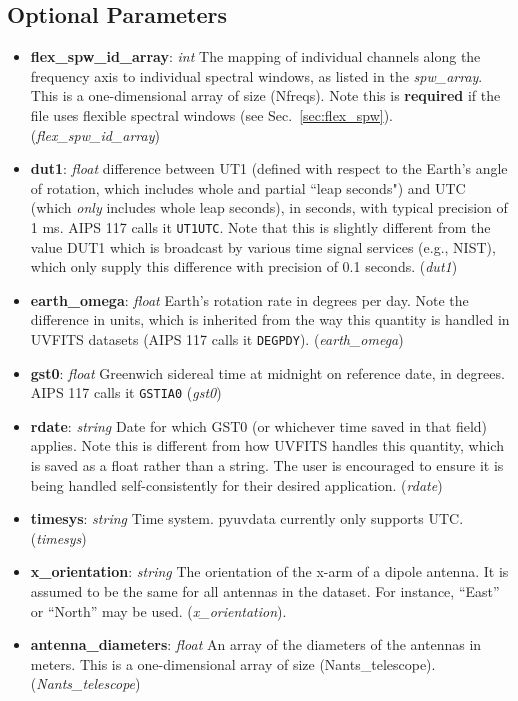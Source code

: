 \documentclass[11pt, oneside]{article}
\begin{document}
\subsection{Optional Parameters}
\label{sec:opt_params}
\begin{itemize}
\item \textbf{flex\_spw\_id\_array}: \textit{int} The mapping of individual
  channels along the frequency axis to individual spectral windows, as listed in
  the \textit{spw\_array}. This is a one-dimensional array of size
  (Nfreqs). Note this is \textbf{required} if the file uses flexible
  spectral windows (see
  Sec.~\ref{sec:flex_spw}). (\textit{flex\_spw\_id\_array})
\item \textbf{dut1}: \textit{float} difference between UT1 (defined with respect to the
  Earth's angle of rotation, which includes whole and partial ``leap seconds") and UTC
  (which \emph{only} includes whole leap seconds), in seconds, with typical precision of
  1 ms. AIPS 117 calls it \verb+UT1UTC+. Note that this is slightly different from
  the value DUT1 which is broadcast by various time signal services (e.g., NIST), which
  only supply this difference with precision of 0.1 seconds. (\textit{dut1})
\item \textbf{earth\_omega}: \textit{float} Earth's rotation rate in degrees per
  day. Note the difference in units, which is inherited from the way this
  quantity is handled in UVFITS datasets (AIPS 117 calls it \verb+DEGPDY+).
  (\textit{earth\_omega})
\item \textbf{gst0}: \textit{float} Greenwich sidereal time at midnight on
  reference date, in degrees. AIPS 117 calls it \verb+GSTIA0+ (\textit{gst0})
\item \textbf{rdate}: \textit{string} Date for which GST0 (or whichever time
  saved in that field) applies. Note this is different from how UVFITS handles
  this quantity, which is saved as a float rather than a string. The user is
  encouraged to ensure it is being handled self-consistently for their desired
  application. (\textit{rdate})
\item \textbf{timesys}: \textit{string} Time system. pyuvdata currently only
  supports UTC. (\textit{timesys})
\item \textbf{x\_orientation}: \textit{string} The orientation of the x-arm of a
  dipole antenna. It is assumed to be the same for all antennas in the
  dataset. For instance, ``East'' or ``North'' may be
  used. (\textit{x\_orientation}).
\item \textbf{antenna\_diameters}: \textit{float} An array of the diameters of
  the antennas in meters. This is a one-dimensional array of size
  (Nants\_telescope). (\textit{Nants\_telescope})



\end{itemize}
\end{document}
